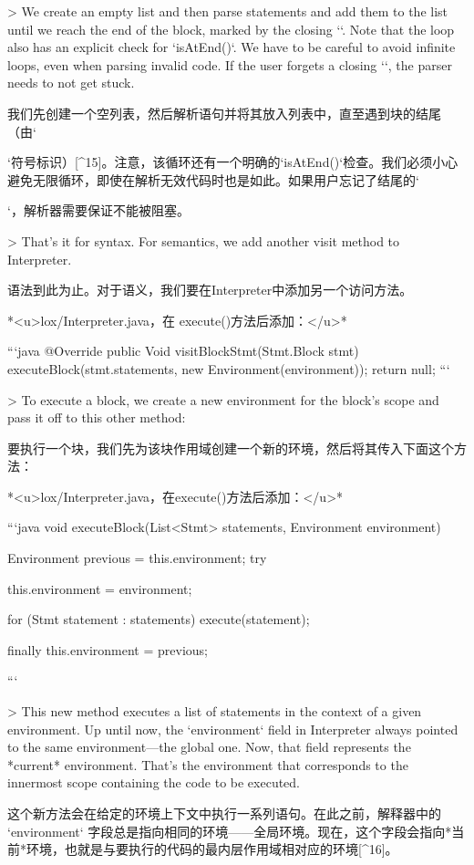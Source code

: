 \documentclass[cn,11pt,chinese]{elegantbook}
\begin{document}
{{{{{> We create an empty list and then parse statements and add them to the list until we reach the end of the block, marked by the closing `}`. Note that the loop also has an explicit check for `isAtEnd()`. We have to be careful to avoid infinite loops, even when parsing invalid code. If the user forgets a closing `}`, the parser needs to not get stuck.

我们先创建一个空列表，然后解析语句并将其放入列表中，直至遇到块的结尾（由`}`符号标识）[^15]。注意，该循环还有一个明确的`isAtEnd()`检查。我们必须小心避免无限循环，即使在解析无效代码时也是如此。如果用户忘记了结尾的`}`，解析器需要保证不能被阻塞。

> That’s it for syntax. For semantics, we add another visit method to Interpreter.

语法到此为止。对于语义，我们要在Interpreter中添加另一个访问方法。

*<u>lox/Interpreter.java，在 execute()方法后添加：</u>*

```java
  @Override
  public Void visitBlockStmt(Stmt.Block stmt) {
    executeBlock(stmt.statements, new Environment(environment));
    return null;
  }
```

> To execute a block, we create a new environment for the block’s scope and pass it off to this other method:

要执行一个块，我们先为该块作用域创建一个新的环境，然后将其传入下面这个方法：

*<u>lox/Interpreter.java，在execute()方法后添加：</u>*

```java
  void executeBlock(List<Stmt> statements,
                    Environment environment) {
    Environment previous = this.environment;
    try {
      this.environment = environment;

      for (Stmt statement : statements) {
        execute(statement);
      }
    } finally {
      this.environment = previous;
    }
  }
```

> This new method executes a list of statements in the context of a given environment. Up until now, the `environment` field in Interpreter always pointed to the same environment—the global one. Now, that field represents the *current* environment. That’s the environment that corresponds to the innermost scope containing the code to be executed.

这个新方法会在给定的环境上下文中执行一系列语句。在此之前，解释器中的 `environment` 字段总是指向相同的环境——全局环境。现在，这个字段会指向*当前*环境，也就是与要执行的代码的最内层作用域相对应的环境[^16]。

}
\end{document}
